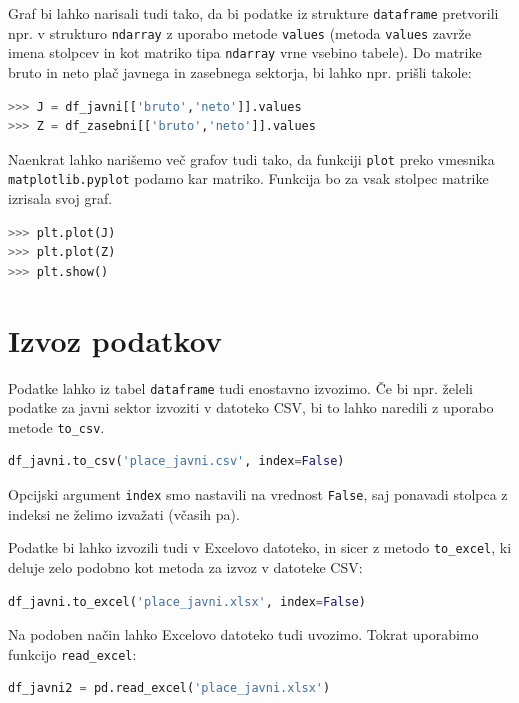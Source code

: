 Graf bi lahko narisali tudi tako, da bi podatke iz strukture \texttt{dataframe} pretvorili npr. v strukturo \texttt{ndarray} z uporabo metode \texttt{values} (metoda \texttt{values} zavrže imena stolpcev in kot matriko tipa \texttt{ndarray} vrne vsebino tabele). Do matrike bruto in neto plač javnega in zasebnega sektorja, bi lahko npr. prišli takole:
\begin{lstlisting}[language=python]
>>> J = df_javni[['bruto','neto']].values
>>> Z = df_zasebni[['bruto','neto']].values
\end{lstlisting}
Naenkrat lahko narišemo več grafov tudi tako, da funkciji \texttt{plot} preko vmesnika \texttt{matplotlib.pyplot} podamo kar matriko. Funkcija bo za vsak stolpec matrike izrisala svoj graf.
\begin{lstlisting}[language=python]
>>> plt.plot(J)
>>> plt.plot(Z)
>>> plt.show()
\end{lstlisting}

\section{Izvoz podatkov}

Podatke lahko iz tabel \texttt{dataframe} tudi enostavno izvozimo. Če bi npr. želeli podatke za javni sektor izvoziti v datoteko CSV, bi to lahko naredili z uporabo metode \texttt{to\_csv}.
\begin{lstlisting}[language=python]
df_javni.to_csv('place_javni.csv', index=False)
\end{lstlisting}
Opcijski argument \texttt{index} smo nastavili na vrednost \texttt{False}, saj ponavadi stolpca z indeksi ne želimo izvažati (včasih pa). 

Podatke bi lahko izvozili tudi v Excelovo datoteko, in sicer z metodo \texttt{to\_excel}, ki deluje zelo podobno kot metoda za izvoz v datoteke CSV:
\begin{lstlisting}[language=python]
df_javni.to_excel('place_javni.xlsx', index=False)
\end{lstlisting}
Na podoben način lahko Excelovo datoteko tudi uvozimo. Tokrat uporabimo funkcijo \texttt{read\_excel}:
\begin{lstlisting}[language=python]
df_javni2 = pd.read_excel('place_javni.xlsx')
\end{lstlisting}
